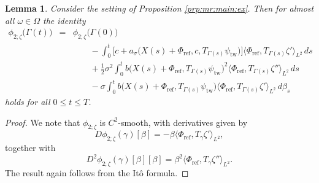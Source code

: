 \documentclass[10pt]{articleHJ}
\newtheorem{lem}[thm]{Lemma}
\numberwithin{equation}{section}
\begin{document}
\begin{lem}
Consider the setting
of Proposition
\ref{prp:mr:main:ex}.
Then for almost all $\omega \in \Omega$
the identity
\begin{equation}
\label{eq:sps:ito:ii}
\begin{array}{lcl}
\phi_{2;\zeta}\big( \Gamma(t) \big)
 & = & \phi_{2;\zeta}( \Gamma(0) \big)
\\[0.2cm]
& & \qquad
    - \int_0^t
  \big[
    c + a_{\sigma}\big( X(s) + \Phi_{\mathrm{ref}}, c, T_{\Gamma(s)} \psi_{\mathrm{tw}} \big)
  \big]
    \langle \Phi_{\mathrm{ref}}, T_{\Gamma(s)} \zeta'
       \rangle_{L^2} \, d s
\\[0.2cm]
& & \qquad
  + \frac{1}{2} \sigma^2 \int_0^t
     b\big(X(s) + \Phi_{\mathrm{ref}}, T_{\Gamma(s)} \psi_{\mathrm{tw}} \big)^2
   \langle \Phi_{\mathrm{ref}} , T_{\Gamma(s)} \zeta'' \rangle_{L^2}
    \, d s
\\[0.2cm]
& & \qquad
  - \sigma \int_0^t
   b\big( X(s)  + \Phi_{\mathrm{ref}}, T_{\Gamma(s)} \psi_{\mathrm{tw}} \big)
    \langle \Phi_{\mathrm{ref}} , T_{\Gamma(s)} \zeta'
       \rangle_{L^2} \, d \beta_s
\end{array}
\end{equation}
holds for all $0 \le t \le T$.
\end{lem}
\begin{proof}
We note that $\phi_{2;\zeta}$ is $C^2$-smooth,
with derivatives given by
\begin{equation}
D \phi_{2;\zeta}(\gamma)[\beta]
 = - \beta \langle \Phi_{\mathrm{ref}} , T_{\gamma} \zeta'  \rangle_{L^2} ,
\end{equation}
together with
\begin{equation}
D^2 \phi_{2;\zeta}( \gamma)[ \beta][ \beta]
 = \beta^2 \langle \Phi_{\mathrm{ref}} , T_{\gamma} \zeta'' \rangle_{L^2}.
\end{equation}
The result again follows from the It\^o formula.
\end{proof}
\end{document}

